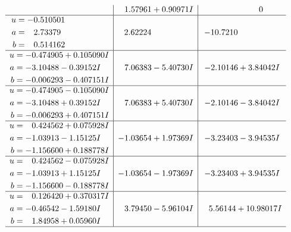 \documentclass[1p]{elsarticle_modified}
\theoremstyle{definition}
\begin{document}
$$\begin{array}{c|c|c}
 & \phantom{-}1.57961 + 0.90971 I & \phantom{-0.000000 } 0 \\ \hline\begin{aligned}
u &= -0.510501\phantom{ +0.000000I} \\
a &= \phantom{-}2.73379\phantom{ +0.000000I} \\
b &= \phantom{-}0.514162\phantom{ +0.000000I}\end{aligned}
 & \phantom{-}2.62224\phantom{ +0.000000I} & -10.7210\phantom{ +0.000000I} \\ \hline\begin{aligned}
u &= -0.474905 + 0.105090 I \\
a &= -3.10488 - 0.39152 I \\
b &= -0.006293 - 0.407151 I\end{aligned}
 & \phantom{-}7.06383 - 5.40730 I & -2.10146 + 3.84042 I \\ \hline\begin{aligned}
u &= -0.474905 - 0.105090 I \\
a &= -3.10488 + 0.39152 I \\
b &= -0.006293 + 0.407151 I\end{aligned}
 & \phantom{-}7.06383 + 5.40730 I & -2.10146 - 3.84042 I \\ \hline\begin{aligned}
u &= \phantom{-}0.424562 + 0.075928 I \\
a &= -1.03913 - 1.15125 I \\
b &= -1.156600 + 0.188778 I\end{aligned}
 & -1.03654 + 1.97369 I & -3.23403 - 3.94535 I \\ \hline\begin{aligned}
u &= \phantom{-}0.424562 - 0.075928 I \\
a &= -1.03913 + 1.15125 I \\
b &= -1.156600 - 0.188778 I\end{aligned}
 & -1.03654 - 1.97369 I & -3.23403 + 3.94535 I \\ \hline\begin{aligned}
u &= \phantom{-}0.126420 + 0.370317 I \\
a &= -0.46542 - 1.59180 I \\
b &= \phantom{-}1.84958 + 0.05960 I\end{aligned}
 & \phantom{-}3.79450 - 5.96104 I & \phantom{-}5.56144 + 10.98017 I\\
 \hline 
 \end{array}$$\newpage$$\begin{array}{c|c|c}  

\end{array}$$
\end{document}
